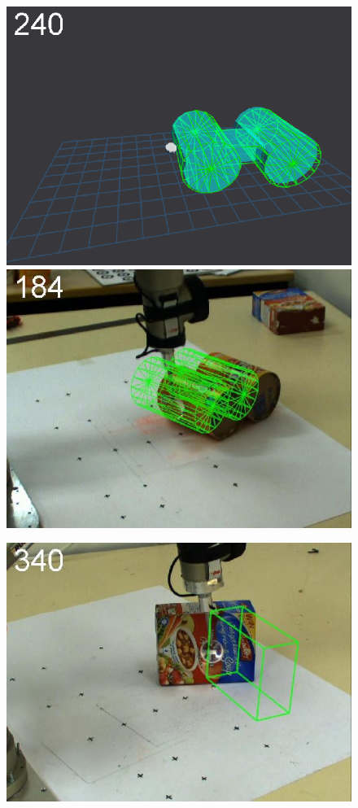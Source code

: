 \begin{figure}[tbp]
{\includegraphics[width=\imgCXwid]{images/C5_3exp_6_4}
\includegraphics[width=\imgCXwid]{images/C2_3exp_75_4}
}
\centerline{
\includegraphics[width=\imgCXwid]{images/C1_2exp_87_5}
}
\end{figure}
